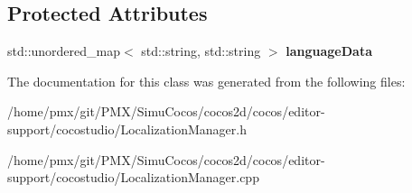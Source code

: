 \subsection*{Protected Attributes}
\begin{DoxyCompactItemize}
\item 
\mbox{\label{classcocostudio_1_1BinLocalizationManager_a0dc1eed646ce74e250f74873607b0f7f}} 
std\+::unordered\+\_\+map$<$ std\+::string, std\+::string $>$ {\bfseries language\+Data}
\end{DoxyCompactItemize}


The documentation for this class was generated from the following files\+:\begin{DoxyCompactItemize}
\item 
/home/pmx/git/\+P\+M\+X/\+Simu\+Cocos/cocos2d/cocos/editor-\/support/cocostudio/Localization\+Manager.\+h\item 
/home/pmx/git/\+P\+M\+X/\+Simu\+Cocos/cocos2d/cocos/editor-\/support/cocostudio/Localization\+Manager.\+cpp\end{DoxyCompactItemize}
